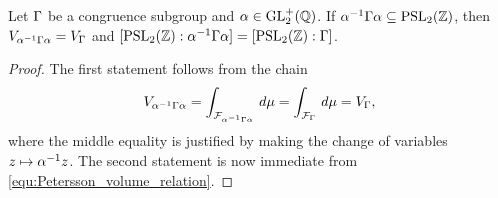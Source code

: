     \begin{lemma}\label{lem:invariance_of_volume}
      Let $\Gamma$ be a congruence subgroup and $\alpha \in \mathrm{GL}_{2}^{+}(\mathbb{Q})$. If $\alpha^{-1}\Gamma\alpha \subseteq \mathrm{PSL}_{2}(\mathbb{Z})$, then $V_{\alpha^{-1}\Gamma\alpha} = V_{\Gamma}$ and $[\mathrm{PSL}_{2}(\mathbb{Z}):\alpha^{-1}\Gamma\alpha] = [\mathrm{PSL}_{2}(\mathbb{Z}):\Gamma]$.
    \end{lemma}
    \begin{proof}
      The first statement follows from the chain
      \[
        V_{\alpha^{-1}\Gamma\alpha} = \int_{\mathcal{F}_{\alpha^{-1}\Gamma\alpha}}\,d\mu = \int_{\mathcal{F}_{\Gamma}}\,d\mu = V_{\Gamma},
      \]
      where the middle equality is justified by making the change of variables $z \mapsto \alpha^{-1}z$. The second statement is now immediate from \cref{equ:Petersson_volume_relation}.
    \end{proof}